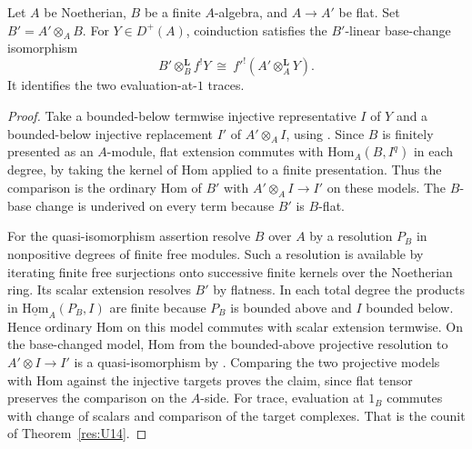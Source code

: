 \begin{proposition}\label{res:U16}
Let \(A\) be Noetherian, \(B\) be a finite \(A\)-algebra,
and \(A\to A'\) be flat. Set \(B'=A'\otimes_A B\).
For \(Y\in D^+(A)\), coinduction satisfies the \(B'\)-linear
base-change isomorphism
\[
 B'\otimes_B^{\mathbf L}f^!Y
   \ \cong\ f'^!(A'\otimes_A^{\mathbf L}Y).
\]
It identifies the two evaluation-at-\(1\) traces.
\end{proposition}
\begin{proof}
Take a bounded-below termwise injective representative \(I\) of
\(Y\) and a bounded-below injective replacement \(I'\) of
\(A'\otimes_A I\), using \cite[R01, R03]{ha-core}.
Since \(B\) is finitely presented as an \(A\)-module, flat
extension commutes with \(\mathrm{Hom}_A(B,I^q)\) in each
degree, by taking the kernel of Hom applied to a finite
presentation. Thus the comparison is the ordinary Hom
of \(B'\) with \(A'\otimes_A I\to I'\) on these models.
The \(B\)-base change is underived on every term because
\(B'\) is \(B\)-flat.

For the quasi-isomorphism assertion resolve \(B\) over \(A\)
by a resolution \(P_B\) in nonpositive degrees of finite free
modules. Such a resolution is available by iterating finite
free surjections onto successive finite kernels over the
Noetherian ring. Its scalar extension resolves \(B'\)
by flatness. In each total degree the products in
\(\underline{\mathrm{Hom}}_A(P_B,I)\) are finite because
\(P_B\) is bounded above and \(I\) bounded below. Hence
ordinary Hom on this model commutes with scalar extension
termwise. On the base-changed model, Hom from the
bounded-above projective resolution to \(A'\otimes I\to I'\)
is a quasi-isomorphism by \cite[R03]{ha-core}.
Comparing the two projective models with Hom against
the injective targets proves the claim, since flat tensor
preserves the comparison on the \(A\)-side.
For trace, evaluation at \(1_B\) commutes with change of
scalars and comparison of the target complexes. That is the
counit of Theorem~\ref{res:U14}.
\end{proof}

